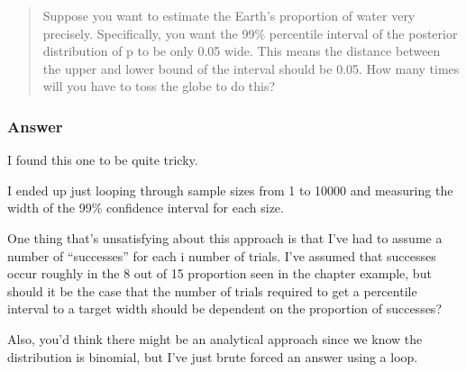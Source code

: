 \documentclass[
]{book}
\begin{document}
\begin{quote}
Suppose you want to estimate the Earth's proportion of water very precisely. Specifically, you want the 99\% percentile interval of the posterior distribution of p to be only 0.05 wide. This means the distance between the upper and lower bound of the interval should be 0.05. How many times will you have to toss the globe to do this?
\end{quote}

\hypertarget{answer-27}{%
\subsubsection*{Answer}\label{answer-27}}

I found this one to be quite tricky.

I ended up just looping through sample sizes from 1 to 10000 and measuring the width of the 99\% confidence interval for each size.

One thing that's unsatisfying about this approach is that I've had to assume a number of ``successes'' for each i number of trials. I've assumed that successes occur roughly in the 8 out of 15 proportion seen in the chapter example, but should it be the case that the number of trials required to get a percentile interval to a target width should be dependent on the proportion of successes?

Also, you'd think there might be an analytical approach since we know the distribution is binomial, but I've just brute forced an answer using a loop.
\end{document}
